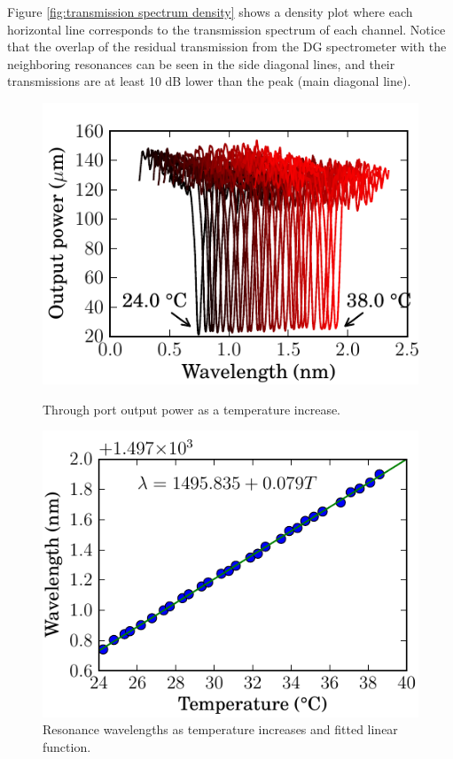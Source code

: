 \documentclass[12pt,twoside,english]{book}
\renewcommand{\~}{\perispomeni}%
\numberwithin{equation}{section}
\numberwithin{figure}{section}
\begin{document}
Figure \ref{fig:transmission spectrum density} shows a density plot where each horizontal line corresponds to the transmission spectrum of each channel. Notice that the overlap of the residual transmission from the DG spectrometer with the neighboring resonances can be seen in the side diagonal lines, and their transmissions are at least 10 dB lower than the peak (main diagonal line).
\begin{figure}[H]
	\begin{minipage}[t]{0.49\columnwidth}
		\includegraphics{resonance-tempshift}
		\caption{Through port output power as a temperature increase.}
		\label{fig:resonance-tempshift}
	\end{minipage}\hfill{}
	\begin{minipage}[t]{0.49\columnwidth}
		\includegraphics{tempshift-fit}
		\caption{Resonance wavelengths as temperature increases and fitted linear function.}
		\label{fig:tempshift-fit}
	\end{minipage}
\end{figure}
\end{document}
